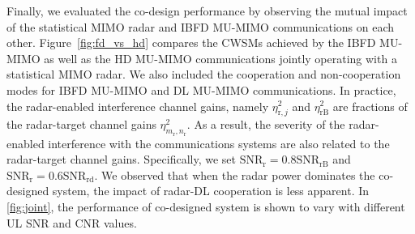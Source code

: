 \documentclass[10pt,journal]{IEEEtran}
\newcommand{\paren}[1]{\left({#1}\right)}
\newcommand{\rr}{_\mathrm{r}}
\theoremstyle{definition}
\begin{document}

Finally, we evaluated the co-design performance by observing the mutual impact of the statistical MIMO radar and IBFD MU-MIMO communications on each other. Figure~\ref{fig:fd_vs_hd} compares the CWSMs achieved by the IBFD MU-MIMO as well as the HD MU-MIMO communications jointly operating with a statistical MIMO radar. We also included the cooperation and non-cooperation modes for IBFD MU-MIMO and DL MU-MIMO communications. In practice, the radar-enabled interference channel gains, namely $\eta^2_{\mathrm{r},j}$ and $\eta^2_{\mathrm{rB}}$ are fractions of the radar-target channel gains $\eta^2_{m\rr,n\rr}$. As a result, the severity of the radar-enabled interference with the communications systems are also related to the radar-target channel gains. Specifically, we set $\mathrm{SNR}_{\textrm{r}}=0.8\mathrm{SNR}_{\textrm{rB}}$ and $\mathrm{SNR}_{\textrm{r}}=0.6\mathrm{SNR}_{\textrm{rd}}$. We observed that when the radar power dominates the co-designed system, the impact of radar-DL cooperation is less apparent. In \figurename{\;\ref{fig:joint}}, the performance of co-designed system is shown to vary with different UL SNR and CNR values.  %
\end{document}
